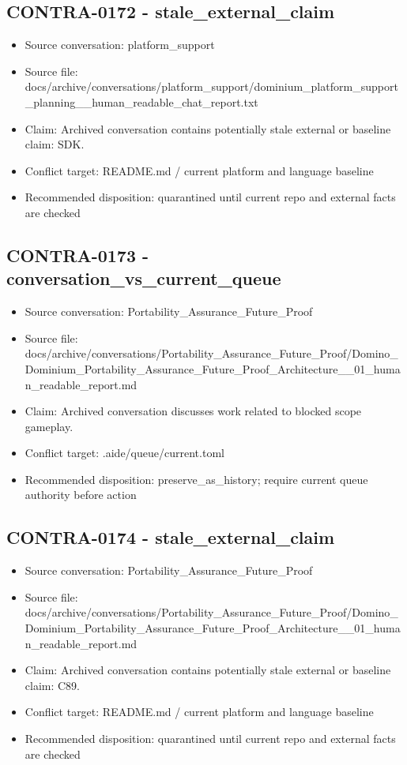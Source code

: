 \documentclass[11pt,a4paper]{report}
\begin{document}
\subsection{CONTRA-0172 - stale\_external\_claim}

\begin{itemize}
\item Source conversation: platform\_support
\item Source file: docs/archive/conversations/platform\_support/dominium\_platform\_support\_planning\_\_human\_readable\_chat\_report.txt
\item Claim: Archived conversation contains potentially stale external or baseline claim: SDK.
\item Conflict target: README.md / current platform and language baseline
\item Recommended disposition: quarantined until current repo and external facts are checked
\end{itemize}

\subsection{CONTRA-0173 - conversation\_vs\_current\_queue}

\begin{itemize}
\item Source conversation: Portability\_Assurance\_Future\_Proof
\item Source file: docs/archive/conversations/Portability\_Assurance\_Future\_Proof/Domino\_Dominium\_Portability\_Assurance\_Future\_Proof\_Architecture\_\_01\_human\_readable\_report.md
\item Claim: Archived conversation discusses work related to blocked scope gameplay.
\item Conflict target: .aide/queue/current.toml
\item Recommended disposition: preserve\_as\_history; require current queue authority before action
\end{itemize}

\subsection{CONTRA-0174 - stale\_external\_claim}

\begin{itemize}
\item Source conversation: Portability\_Assurance\_Future\_Proof
\item Source file: docs/archive/conversations/Portability\_Assurance\_Future\_Proof/Domino\_Dominium\_Portability\_Assurance\_Future\_Proof\_Architecture\_\_01\_human\_readable\_report.md
\item Claim: Archived conversation contains potentially stale external or baseline claim: C89.
\item Conflict target: README.md / current platform and language baseline
\item Recommended disposition: quarantined until current repo and external facts are checked
\end{itemize}
\end{document}
